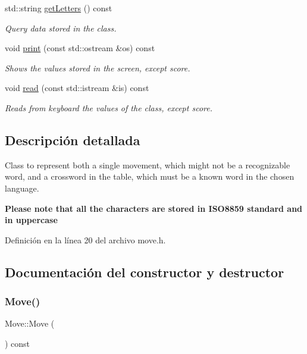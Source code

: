 \begin{DoxyCompactItemize}
std\+::string \hyperlink{classMove_a4b9b78f296ca21b7c474d637ff51d9ae}{get\+Letters} () const
\begin{DoxyCompactList}\small\item\em Query data stored in the class. \end{DoxyCompactList}\item 
\mbox{\label{classMove_a7a1c7c9a9e4d0109e0db8f2762ab0718}} 
void \hyperlink{classMove_a7a1c7c9a9e4d0109e0db8f2762ab0718}{print} (const std\+::ostream \&os) const
\begin{DoxyCompactList}\small\item\em Shows the values stored in the screen, except score. \end{DoxyCompactList}\item 
\mbox{\label{classMove_a6b4aa65766e8e62ee517c50630d55b23}} 
void \hyperlink{classMove_a6b4aa65766e8e62ee517c50630d55b23}{read} (const std\+::istream \&is) const
\begin{DoxyCompactList}\small\item\em Reads from keyboard the values of the class, except score. \end{DoxyCompactList}\end{DoxyCompactItemize}


\subsection{Descripción detallada}
Class to represent both a single movement, which might not be a recognizable word, and a crossword in the table, which must be a known word in the chosen language. 

{\bfseries Please note that all the characters are stored in I\+S\+O8859 standard and in uppercase} 

Definición en la línea 20 del archivo move.\+h.



\subsection{Documentación del constructor y destructor}
\mbox{\label{classMove_aa10d03bba58735a16266b377c0a1a08a}} 
\subsubsection{\texorpdfstring{Move()}{Move()}}
{\footnotesize\ttfamily Move\+::\+Move (\begin{DoxyParamCaption}{ }\end{DoxyParamCaption}) const}



